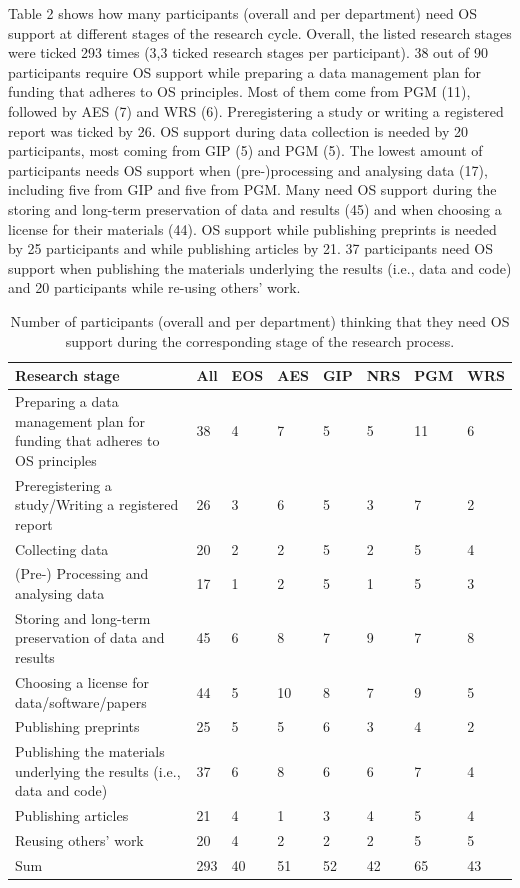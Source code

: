 \documentclass[gc, manuscript]{copernicus}
\begin{document}
Table 2 shows how many participants (overall and per department) need OS
support at different stages of the research cycle. Overall, the listed
research stages were ticked 293 times (3,3 ticked research stages per
participant). 38 out of 90 participants require OS support while
preparing a data management plan for funding that adheres to OS
principles. Most of them come from PGM (11), followed by AES (7) and WRS
(6). Preregistering a study or writing a registered report was ticked by
26. OS support during data collection is needed by 20 participants, most
coming from GIP (5) and PGM (5). The lowest amount of participants needs
OS support when (pre-)processing and analysing data (17), including five
from GIP and five from PGM. Many need OS support during the storing and
long-term preservation of data and results (45) and when choosing a
license for their materials (44). OS support while publishing preprints
is needed by 25 participants and while publishing articles by 21. 37
participants need OS support when publishing the materials underlying
the results (i.e., data and code) and 20 participants while re-using
others' work.

\begin{table}
\caption{Number of participants (overall and per department) thinking that they need OS support during the corresponding stage of the research process.}
\begin{tabular}{p{9cm} | p{0.6cm} | p{0.6cm} | p{0.6cm} | p{0.6cm} | p{0.6cm} | p{0.6cm} | p{0.6cm}} 
\textbf{Research stage} & \textbf{All} & \textbf{EOS} & \textbf{AES} & \textbf{GIP} & \textbf{NRS} & \textbf{PGM} & \textbf{WRS} \\
  \hline 
  Preparing a data management plan for funding that adheres to OS principles &  38 & 4 & 7 & 5 & 5 & 11 & 6 \\ 
  \hline
  Preregistering a study/Writing a registered report & 26 & 3 & 6 & 5 & 3 & 7 & 2 \\ 
  \hline
  Collecting data & 20 & 2 & 2 & 5 & 2 & 5 & 4 \\ 
  \hline
  (Pre-) Processing and analysing data & 17 & 1 & 2 & 5 & 1 & 5 & 3 \\
  \hline
  Storing and long-term preservation of data and results & 45 & 6 & 8 & 7 & 9 & 7 & 8 \\
  \hline
  Choosing a license for data/software/papers & 44 & 5 & 10 & 8 & 7 & 9 & 5 \\
  \hline
  Publishing preprints & 25 & 5 & 5 & 6 & 3 & 4 & 2 \\
  \hline
  Publishing the materials underlying the results (i.e., data and code) & 37 & 6 & 8 & 6 & 6 & 7 & 4 \\
  \hline
  Publishing articles & 21 & 4 & 1 & 3 & 4 & 5 & 4 \\
  \hline
  Reusing others’ work & 20 & 4 & 2 & 2 & 2 & 5 & 5 \\
  \hline
  Sum & 293 & 40 & 51 & 52 & 42 & 65 & 43 \\
  \hline
\end{tabular}
\label{table:2}
\end{table}
\end{document}
